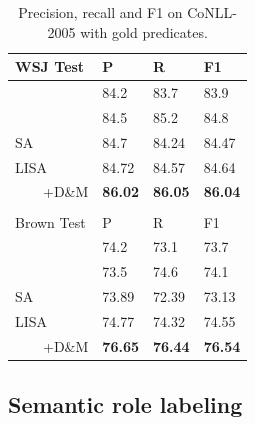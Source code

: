 \documentclass[11pt,a4paper]{article}
\begin{document}
\begin{table}
\begin{tabular}{llll}
WSJ Test & P & R & F1 \\ \hline \hline
\citet{he2018jointly} & 84.2 & 83.7 & 83.9 \\
\citet{tan2018deep} & 84.5 & 85.2 & 84.8 \\ \hline
SA & 84.7 & 84.24 & 84.47 \\
LISA & 84.72 &	84.57	& 84.64 \\ %
\ \ \ \ +D\&M & {\bf 86.02} &	{\bf 86.05} &	{\bf 86.04}  \\
& & & \\
Brown Test &  P & R & F1 \\ \hline \hline
\citet{he2018jointly} & 74.2 & 73.1 & 73.7 \\
\citet{tan2018deep} & 73.5 & 74.6 & 74.1 \\ \hline
SA & 73.89 & 72.39 & 73.13 \\
LISA & 74.77 & 74.32 &	74.55 \\ %
\ \ \ \ +D\&M & {\bf 76.65} & {\bf 76.44} & {\bf 76.54} \\ %
\end{tabular}
\caption{Precision, recall and F1 on CoNLL-2005 with gold predicates. \label{tab:conll05-gold-pred}}
\end{table}

\subsection{Semantic role labeling \label{sec:conll05}}
\end{document}
